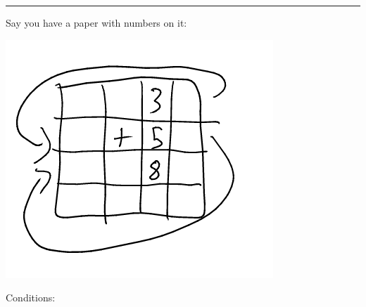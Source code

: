 \documentclass[11pt]{article}
\begin{document}
\noindent\rule{\textwidth}{0.5pt}
Say you have a paper with numbers on it:
\begin{center}
\includegraphics[width=.9\linewidth]{./Images/i22.png}
\end{center}
Conditions: 
\end{document}

